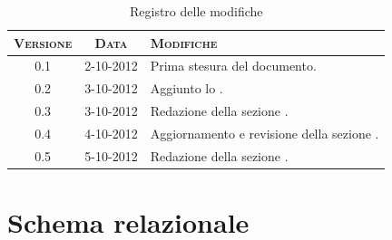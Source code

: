 \documentclass[10pt,a4paper,headinclude,footinclude,hidelinks]{scrreprt} %
\begin{document}
    \title{\rmfamily\normalfont{}}
    \author{}
    \date{\today}
    
    \maketitle
    
    \begin{abstract}
        \noindent Il documento presenta il modello relazionale per l'integrazione dei nuovi criteri di classificazione nella piattaforma.
    \end{abstract}
    
	\begin{table}[ht]
	\centering
	\begin{tabular}{|c|c|l|}
	\hline
	\textsc{Versione} & \textsc{Data} & \textsc{Modifiche} \\ \hline
	0.1 & 2-10-2012 & Prima stesura del documento. \\ \hline
	0.2 & 3-10-2012 & Aggiunto lo \nameref{gfx:schema-relazionale}. \\ \hline
	0.3 & 3-10-2012 & Redazione della sezione \nameref{ch:stage:er:operazioni}. \\ \hline
	0.4 & 4-10-2012 & Aggiornamento e revisione della sezione \nameref{ch:stage:er:operazioni}. \\ \hline
	0.5 & 5-10-2012 & Redazione della sezione \nameref{ch:stage:er:schema}. \\ \hline
	\end{tabular}
	\caption{Registro delle modifiche}
	\label{tab:stage:wp:workload}
	\end{table}

	\tableofcontents

	\chapter{Schema relazionale}
	\label{ch:stage:er:schema}
\end{document}
